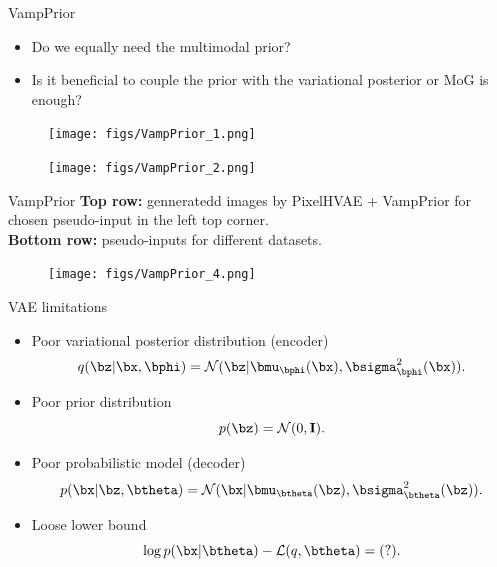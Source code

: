 \begin{frame}{VampPrior}
	\begin{itemize}
	\item Do we equally need the multimodal prior?
	\item Is it beneficial to couple the prior with the variational posterior or MoG is enough?
	\end{itemize}
	\begin{minipage}[t]{0.5\columnwidth}
		\begin{figure}[h]
			\centering
			\texttt{[image: figs/VampPrior\_1.png]}
		\end{figure}
	\end{minipage}%
	\begin{minipage}[t]{0.5\columnwidth}
		\begin{figure}[h]
			\centering
			\texttt{[image: figs/VampPrior\_2.png]}
		\end{figure}
	\end{minipage}
\end{frame}
\begin{frame}{VampPrior}
	\vspace{0.1cm}
	\textbf{Top row:} genneratedd images by PixelHVAE + VampPrior for chosen pseudo-input in the left top corner. \\
	\vspace{0.1cm}
	\textbf{Bottom row:} pseudo-inputs for different datasets.
	\begin{figure}[h]
		\centering
		\texttt{[image: figs/VampPrior\_4.png]}
	\end{figure}
\end{frame}
\begin{frame}{VAE limitations}
\begin{itemize}
	\item Poor variational posterior distribution (encoder)
	\[
	q(\bz | \bx, \bphi) = \mathcal{N}(\bz| \bmu_{\bphi}(\bx), \bsigma^2_{\bphi}(\bx)).
	\]
	\item Poor prior distribution
	\[
	p(\bz) = \mathcal{N}(0, \mathbf{I}).
	\]
	\item Poor probabilistic model (decoder)
	\[
	p(\bx | \bz, \btheta) = \mathcal{N}(\bx| \bmu_{\btheta}(\bz), \bsigma^2_{\btheta}(\bz)).
	\]
	\item Loose lower bound
	\[
	\log p(\bx | \btheta) - \mathcal{L}(q, \btheta) = (?).
	\]
\end{itemize}
\end{frame}
